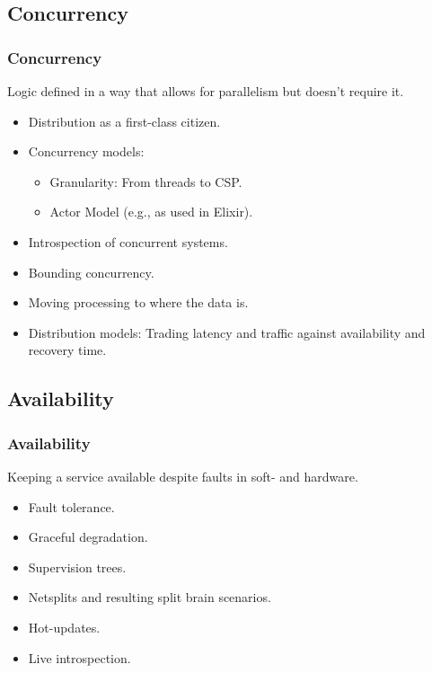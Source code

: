 \subsection{Concurrency}
\begin{frame}
    \frametitle{Concurrency}
    \vspace{0mm}
    Logic defined in a way that allows for parallelism but doesn't require it.
    \vspace{3mm}
    \begin{itemize}
        \item Distribution as a first-class citizen.
        \item Concurrency models:
          \begin{itemize}
            \item Granularity: From threads to CSP.
            \item Actor Model (e.g., as used in Elixir).
          \end{itemize}
        \item Introspection of concurrent systems.
        \item Bounding concurrency.
        \item Moving processing to where the data is.
        \item Distribution models: Trading latency and traffic against availability and recovery time.
    \end{itemize}
\end{frame}

\subsection{Availability}
\begin{frame}
    \frametitle{Availability}
    \vspace{0mm}
    Keeping a service available despite faults in soft- and hardware. 
    \vspace{3mm}
    \begin{itemize}
        \item Fault tolerance.
        \item Graceful degradation.
        \item Supervision trees.
        \item Netsplits and resulting split brain scenarios.
        \item Hot-updates.
        \item Live introspection.
    \end{itemize}
\end{frame}

